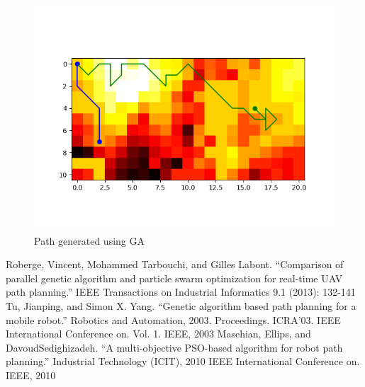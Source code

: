 \documentclass[conference]{IEEEtran}
\begin{document}
\begin{figure}[H]
\centerline{\includegraphics[scale=0.5]{performance/ga_2_drone}}
\caption{Path generated using GA}
\label{img:path_ga_1_drone}
\end{figure}

\newpage
\phantom{Blah}
\newpage

\begin{thebibliography}{00}
 Roberge, Vincent, Mohammed Tarbouchi, and Gilles Labont. ``Comparison of parallel genetic algorithm and particle swarm optimization for real-time UAV path planning.'' IEEE Transactions on Industrial Informatics 9.1 (2013): 132-141
 Tu, Jianping, and Simon X. Yang. ``Genetic algorithm based path planning for a mobile robot.'' Robotics and Automation, 2003. Proceedings. ICRA'03. IEEE International Conference on. Vol. 1. IEEE, 2003
 Masehian, Ellips, and DavoudSedighizadeh. ``A multi-objective PSO-based algorithm for robot path planning.'' Industrial Technology (ICIT), 2010 IEEE International Conference on. IEEE, 2010
\end{thebibliography}
\end{document}
